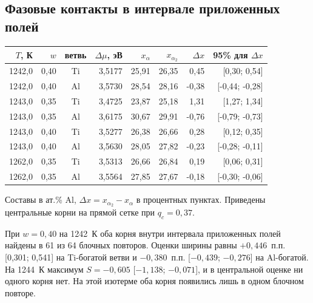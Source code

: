\documentclass[11pt,a4paper]{article}
\begin{document}
\begin{minipage}[t]{.49\linewidth}
\begin{center}
\end{center}\end{minipage}
\subsection*{Фазовые контакты в интервале приложенных полей}
\begin{center}\small\setlength{\tabcolsep}{3.6pt}\begin{tabular}{@{}rrcrrrrr@{}}\toprule
\(T\), К & \(w\) & ветвь & \(\Delta\mu\), эВ & \(x_{\alpha}\) & \(x_{\alpha_2}\) & \(\Delta x\) & 95\% для \(\Delta x\)\\\midrule
1242,0 & 0,40 & Ti & 3,5177 & 25,91 & 26,35 & 0,45 & [0,30; 0,54]\\
1242,0 & 0,40 & Al & 3,5730 & 28,54 & 28,16 & -0,38 & [-0,44; -0,28]\\
1243,0 & 0,35 & Ti & 3,4725 & 23,87 & 25,18 & 1,31 & [1,27; 1,34]\\
1243,0 & 0,35 & Al & 3,6175 & 30,67 & 29,91 & -0,76 & [-0,79; -0,73]\\
1243,0 & 0,40 & Ti & 3,5277 & 26,38 & 26,66 & 0,28 & [0,12; 0,35]\\
1243,0 & 0,40 & Al & 3,5630 & 28,05 & 27,82 & -0,23 & [-0,28; -0,11]\\
1262,0 & 0,35 & Ti & 3,5313 & 26,66 & 26,84 & 0,19 & [0,06; 0,31]\\
1262,0 & 0,35 & Al & 3,5564 & 27,85 & 27,67 & -0,18 & [-0,30; -0,06]\\
\bottomrule\end{tabular}\end{center}
{\small Составы в ат.\% Al, \(\Delta x=x_{\alpha_2}-x_\alpha\) в процентных пунктах. Приведены центральные корни на прямой сетке при \(q_c=0{,}37\).}\par
При \(w=0{,}40\) на 1242~К оба корня внутри интервала приложенных полей найдены в 61 из 64 блочных повторов. Оценки ширины равны \(+0{,}446\)~п.п. [0,301; 0,541] на Ti-богатой ветви и \(-0{,}380\)~п.п. [\(-0{,}439\); \(-0{,}276\)] на Al-богатой. На 1244~К максимум \(S=-0{,}605\) [\(-1{,}138\); \(-0{,}071\)], и в центральной оценке ни одного корня нет. На этой изотерме оба корня появились лишь в одном блочном повторе.
\end{document}
